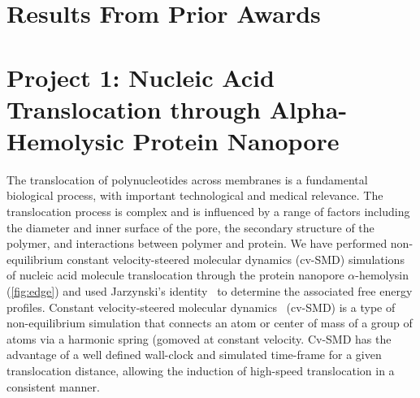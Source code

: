 \documentclass[a4paper,10pt]{article}
\begin{document}


\section{Results From Prior Awards}




\section{Project 1: Nucleic Acid Translocation through Alpha-Hemolysic Protein Nanopore}

The translocation of polynucleotides across membranes is a fundamental biological process, with important technological and medical relevance.  The translocation process is complex and is influenced by a range of factors including the diameter and inner surface of the pore, the secondary structure of the polymer, and interactions between polymer and protein. We have performed non-equilibrium constant velocity-steered molecular dynamics (cv-SMD) simulations of nucleic acid molecule translocation through the protein nanopore $\alpha$-hemolysin (\ref{fig:edge}) and used Jarzynski's identity~\cite{jarz} to determine the associated free energy profiles. Constant velocity-steered molecular dynamics~\cite{namd} (cv-SMD) is a type of non-equilibrium simulation that connects an atom or center of mass of a group of atoms via a harmonic spring (gomoved at constant velocity. Cv-SMD has the advantage of a well defined wall-clock and simulated time-frame for a given translocation distance, allowing the induction of high-speed translocation in a consistent manner.
\end{document}
